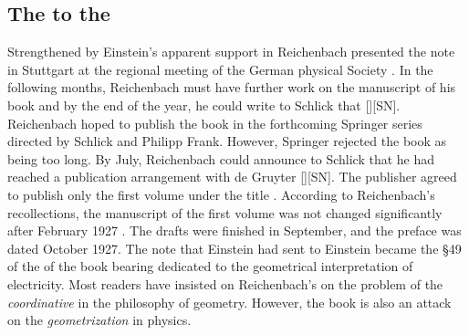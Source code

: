 \documentclass[draft]{article}
\newcommand{\PRZL}{\citetitle{Reichenbach1928}\xspace}
\newcommand{\Reich}{Reichenbach\xspace}
\newcommand{\FP}{\german{Fernparallelismus}\xspace}
\begin{document}
\subsection{The \Ap to the \PRZL}

Strengthened by Einstein's apparent support in  Reichenbach presented the note in Stuttgart at the regional meeting of the German physical Society \citep{Reichenbach1926d}. In the following months, Reichenbach must have further work on the manuscript of his book and by the end of the year, he could write to Schlick that  [][SN]\label{RZL1926}. Reichenbach hoped to publish the book in the forthcoming Springer series  directed by Schlick and Philipp Frank. However, Springer rejected the book as being too long. By July, Reichenbach could announce to Schlick that he had reached a publication arrangement with de Gruyter [][SN]. The publisher agreed to publish only the first volume under the title . According to \Reich's recollections, the manuscript of the first volume was not changed significantly after February 1927 \citep[044-06-25]{HR}. The drafts were finished in September, and the preface was dated October 1927. The note that Einstein had sent to Einstein became the \S49 of the \Ap of the book bearing dedicated to the geometrical interpretation of electricity. Most readers have insisted on Reichenbach's on the problem of the \emph{coordinative} in the philosophy of geometry. However, the book is also an attack on the \emph{geometrization} in physics.


 
\end{document}
